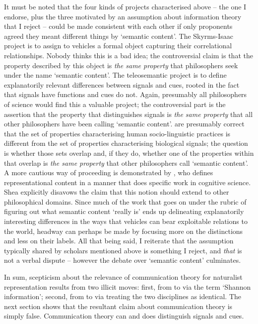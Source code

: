 It must be noted that the four kinds of projects characterised above -- the one I endorse, plus the three motivated by an assumption about information theory that I reject -- could be made consistent with each other if only proponents agreed they meant different things by `semantic content'.
The Skyrms-Isaac project is to assign to vehicles a formal object capturing their correlational relationships.
Nobody thinks this is a bad idea; the controversial claim is that the property described by this object is \textit{the same property} that philosophers seek under the name `semantic content'.
The teleosemantic project is to define explanatorily relevant differences between signals and cues, rooted in the fact that signals have functions and cues do not.
Again, presumably all philosophers of science would find this a valuable project; the controversial part is the assertion that the property that distinguishes signals is \textit{the same property} that all other philosophers have been calling `semantic content'.
\citet{hutto2013radicalizing} are presumably correct that the set of properties characterising human socio-linguistic practices is different from the set of properties characterising biological signals; the question is whether those sets overlap and, if they do, whether one of the properties within that overlap is \textit{the same property} that other philosophers call `semantic content'.
A more cautious way of proceeding is demonstrated by \citet{shea2018representation}, who defines representational content in a manner that does specific work in cognitive science.
Shea explicitly disavows the claim that this notion should extend to other philosophical domains.
Since much of the work that goes on under the rubric of figuring out what semantic content `really is' ends up delineating explanatorily interesting differences in the ways that vehicles can bear exploitable relations to the world, headway can perhaps be made by focusing more on the distinctions and less on their labels.
All that being said, I reiterate that the assumption typically shared by scholars mentioned above is something I reject, and \textit{that} is not a verbal dispute -- however the debate over `semantic content' culminates.

In sum, scepticism about the relevance of communication theory for naturalist representation results from two illicit moves: first, from \ami{} to \ait{} via the term `Shannon information'; second, from \ait{} to \act{} via treating the two disciplines as identical.
The next section shows that the resultant claim about communication theory is simply false.
Communication theory can and does distinguish signals and cues.


